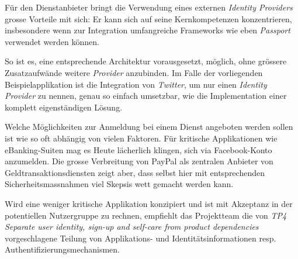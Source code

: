 Für den Dienstanbieter bringt die Verwendung eines externen \emph{Identity Providers} grosse Vorteile mit sich: Er kann sich auf seine Kernkompetenzen konzentrieren, insbesondere wenn zur Integration umfangreiche Frameworks wie eben \emph{Passport} verwendet werden können.

So ist es, eine entsprechende Architektur vorausgesetzt, möglich, ohne grössere Zusatzaufwände weitere \emph{Provider} anzubinden. Im Falle der vorliegenden Beispielapplikation ist die Integration von \emph{Twitter}, um nur einen \emph{Identity Provider} zu nennen, genau so einfach umsetzbar, wie die Implementation einer komplett eigenständigen Lösung.

Welche Möglichkeiten zur Anmeldung bei einem Dienst angeboten werden sollen ist wie so oft abhängig von vielen Faktoren. Für kritische Applikationen wie eBanking-Suiten mag es Heute lächerlich klingen, sich via Facebook-Konto anzumelden. Die grosse Verbreitung von PayPal \cite{paypal} als zentralen Anbieter von Geldtransaktionsdiensten zeigt aber, dass selbst hier mit entsprechenden Sicherheitsmassnahmen viel Skepsis wett gemacht werden kann.

Wird eine weniger kritische Applikation konzipiert und ist mit Akzeptanz in der potentiellen Nutzergruppe zu rechnen, empfiehlt das Projektteam die von \emph{TP4 Separate user identity, sign-up and self-care from product dependencies} vorgeschlagene Teilung von Applikations- und Identitätsinformationen resp. Authentifizierungsmechanismen.
